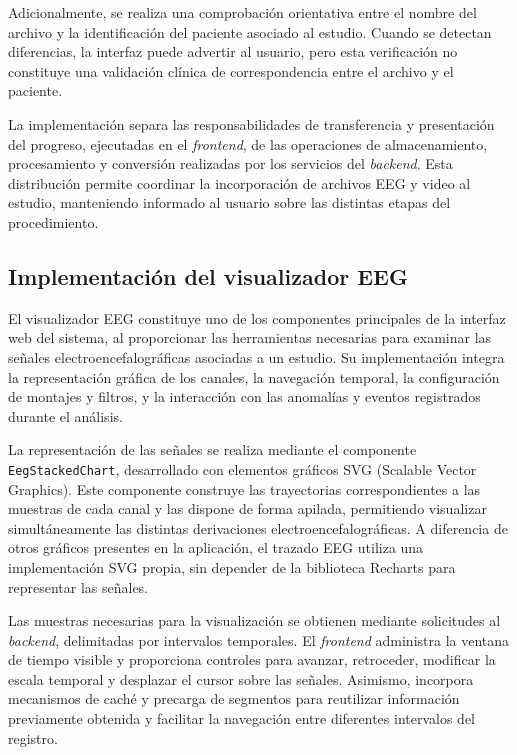 Adicionalmente, se realiza una comprobación
orientativa entre el nombre del archivo
y la identificación del paciente asociado
al estudio. Cuando se detectan diferencias,
la interfaz puede advertir al usuario,
pero esta verificación no constituye
una validación clínica de correspondencia
entre el archivo y el paciente.

La implementación separa las
responsabilidades de transferencia y
presentación del progreso, ejecutadas
en el \textit{frontend}, de las operaciones de
almacenamiento, procesamiento y conversión
realizadas por los servicios del \textit{backend}.
Esta distribución permite coordinar
la incorporación de archivos EEG y video
al estudio, manteniendo informado al
usuario sobre las distintas etapas
del procedimiento.


\subsection{Implementación del visualizador EEG}

El visualizador EEG constituye uno de los
componentes principales de la interfaz web
del sistema, al proporcionar las herramientas
necesarias para examinar las señales
electroencefalográficas asociadas a un estudio.
Su implementación integra la representación
gráfica de los canales, la navegación temporal,
la configuración de montajes y filtros, y
la interacción con las anomalías y eventos
registrados durante el análisis.

La representación de las señales se realiza
mediante el componente \texttt{EegStackedChart},
desarrollado con elementos gráficos SVG
(Scalable Vector Graphics). Este componente
construye las trayectorias correspondientes
a las muestras de cada canal y las dispone
de forma apilada, permitiendo visualizar
simultáneamente las distintas derivaciones
electroencefalográficas. A diferencia de
otros gráficos presentes en la aplicación,
el trazado EEG utiliza una implementación
SVG propia, sin depender de la biblioteca
Recharts para representar las señales.

Las muestras necesarias para la visualización
se obtienen mediante solicitudes al \textit{backend},
delimitadas por intervalos temporales.
El \textit{frontend} administra la ventana de tiempo
visible y proporciona controles para avanzar,
retroceder, modificar la escala temporal
y desplazar el cursor sobre las señales.
Asimismo, incorpora mecanismos de caché
y precarga de segmentos para reutilizar
información previamente obtenida y facilitar
la navegación entre diferentes intervalos
del registro.

